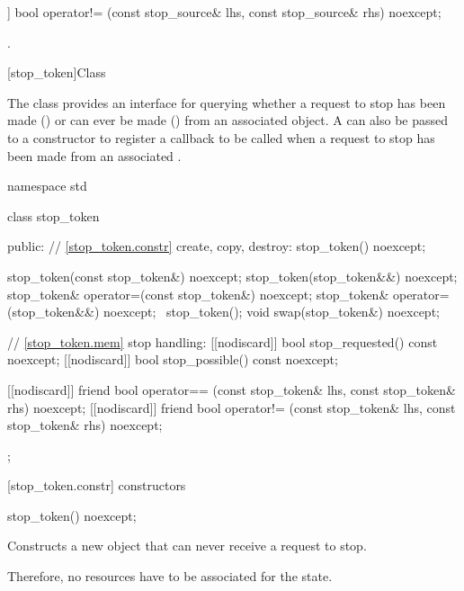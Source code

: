 {%
\begin{itemdecl}
[[nodiscard]] bool operator!= (const stop_source& lhs, const stop_source& rhs) noexcept;
\end{itemdecl}
\begin{itemdescr}
  \pnum\returns {}.
\end{itemdescr}


%
[stop_token]{Class }

\pnum
{}%
The class  provides an interface for querying whether
a request to stop has been made () or can ever be made
() from an associated  object.
A  can also be passed to a  constructor
to register a callback to be called when a request to stop has been made from
an associated . 

\begin{codeblock}
namespace std {
  class stop_token {
  public:
    // \ref{stop_token.constr} create, copy, destroy:
    stop_token() noexcept;

    stop_token(const stop_token&) noexcept;
    stop_token(stop_token&&) noexcept;
    stop_token& operator=(const stop_token&) noexcept;
    stop_token& operator=(stop_token&&) noexcept;
    ~stop_token();
    void swap(stop_token&) noexcept;

    // \ref{stop_token.mem} stop handling:
    [[nodiscard]] bool stop_requested() const noexcept;
    [[nodiscard]] bool stop_possible() const noexcept;

    [[nodiscard]] friend bool operator== (const stop_token& lhs, const stop_token& rhs) noexcept;
    [[nodiscard]] friend bool operator!= (const stop_token& lhs, const stop_token& rhs) noexcept;
  };
}
\end{codeblock}


[stop_token.constr]{ constructors}

%
\begin{itemdecl}
stop_token() noexcept;
\end{itemdecl}
\begin{itemdescr}
  \pnum\effects Constructs a new  object that can never receive a request to stop.
                \begin{note} Therefore, no resources have to be associated for the state. \end{note}


\end{itemdescr}}
